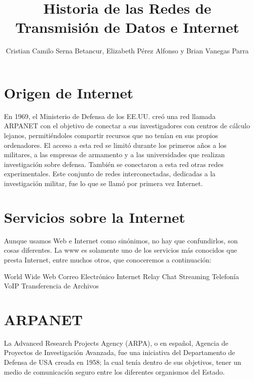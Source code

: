 \documentclass[letterpaper, 10 pt, conference]{ieeeconf}  %
\title{\LARGE \bf
    Historia de las Redes de Transmisión de Datos e Internet
}
\author{ Cristian Camilo Serna Betancur, Elizabeth Pérez Alfonso y Brian Vanegas Parra}
\begin{document}
\maketitle
\thispagestyle{empty}
\pagestyle{empty}






\section{Origen de Internet}

En 1969, el Ministerio de Defensa de los EE.UU. creó una red llamada ARPANET con el objetivo de conectar a sus investigadores con centros de cálculo lejanos, permitiéndoles compartir recursos que no tenían en sus propios ordenadores. El acceso a esta red se limitó durante los primeros años a los militares, a las empresas de armamento y a las universidades que realizan investigación sobre defensa. También se conectaron a esta red otras redes experimentales. Este conjunto de redes interconectadas, dedicadas a la investigación militar, fue lo que se llamó por primera vez Internet.

\section{Servicios sobre la Internet}

Aunque usamos Web e Internet como sinónimos, no hay que confundirlos, son cosas diferentes. La www es solamente uno de los servicios más conocidos que presta Internet, entre muchos otros, que conoceremos a continuación: 

World Wide Web
Correo Electrónico
Internet Relay Chat
Streaming
Telefonía VoIP
Transferencia de Archivos


\section{ARPANET}

La Advanced Research Projects Agency (ARPA), o en español, Agencia de Proyectos de Investigación Avanzada, fue una iniciativa del Departamento de Defensa de USA creada en 1958; la cual tenía dentro de sus objetivos, tener un medio de comunicación seguro entre los diferentes organismos del Estado. 
\end{document}
